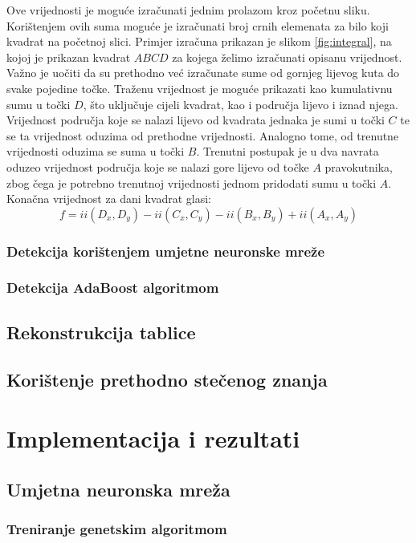 \documentclass[times, utf8, zavrsni, numeric]{fer}
\begin{document}
Ove vrijednosti je moguće izračunati jednim prolazom kroz početnu sliku. 
Korištenjem ovih suma moguće je izračunati broj crnih elemenata za bilo koji kvadrat na početnoj slici.
Primjer izračuna prikazan je slikom \ref{fig:integral}, na kojoj je prikazan kvadrat $ABCD$ za kojega želimo izračunati opisanu vrijednost. 
Važno je uočiti da su prethodno već izračunate sume od gornjeg lijevog kuta do svake pojedine točke.
Traženu vrijednost je moguće prikazati kao kumulativnu sumu u točki $D$, što uključuje cijeli kvadrat, kao i područja lijevo i iznad njega.
Vrijednost područja koje se nalazi lijevo od kvadrata jednaka je sumi u točki $C$ te se ta vrijednost oduzima od prethodne vrijednosti.
Analogno tome, od trenutne vrijednosti oduzima se suma u točki $B$.
Trenutni postupak je u dva navrata oduzeo vrijednost područja koje se nalazi gore lijevo od točke $A$ pravokutnika, zbog čega je potrebno trenutnoj vrijednosti jednom pridodati sumu u točki $A$.
Konačna vrijednost za dani kvadrat glasi:
\[
    f = ii(D_x, D_y) - ii(C_x, C_y) - ii(B_x, B_y) + ii(A_x, A_y)
\]

\subsection{Detekcija korištenjem umjetne neuronske mreže}
\subsection{Detekcija AdaBoost algoritmom}

\section{Rekonstrukcija tablice}

\section{Korištenje prethodno stečenog znanja}

\chapter{Implementacija i rezultati}
\section{Umjetna neuronska mreža}
\subsection{Treniranje genetskim algoritmom}
\end{document}
